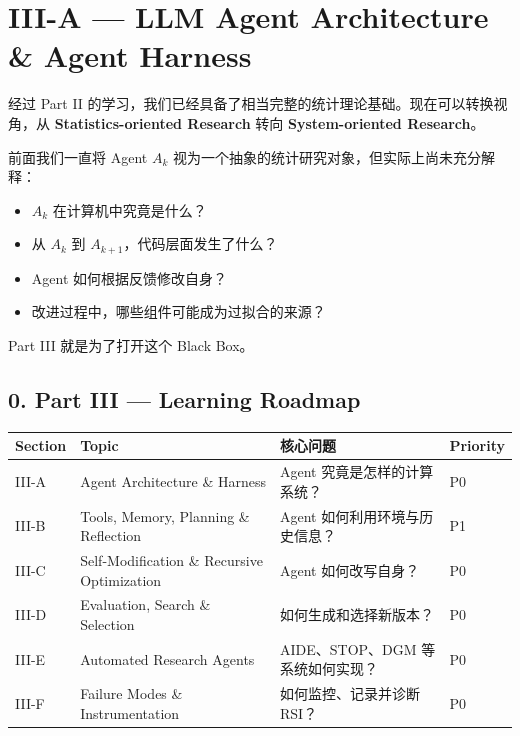 \hypertarget{part-3-31-0001-iii-a-llm-agent-architecture-agent-harness}{%
\section{III-A --- LLM Agent Architecture \& Agent Harness}\label{part-3-31-0001-iii-a-llm-agent-architecture-agent-harness}}

经过 Part II 的学习，我们已经具备了相当完整的统计理论基础。现在可以转换视角，从 \textbf{Statistics-oriented Research} 转向 \textbf{System-oriented Research}。

前面我们一直将 Agent \(A_k\) 视为一个抽象的统计研究对象，但实际上尚未充分解释：

\begin{itemize}
\tightlist
\item
  \(A_k\) 在计算机中究竟是什么？
\item
  从 \(A_k\) 到 \(A_{k+1}\)，代码层面发生了什么？
\item
  Agent 如何根据反馈修改自身？
\item
  改进过程中，哪些组件可能成为过拟合的来源？
\end{itemize}

Part III 就是为了打开这个 Black Box。

\hypertarget{part-3-31-0001-part-iii-learning-roadmap}{%
\subsection{0. Part III --- Learning Roadmap}\label{part-3-31-0001-part-iii-learning-roadmap}}

\begin{readertable}
\begin{longtable}[]{@{}
  >{\raggedright\arraybackslash}p{}
  >{\raggedright\arraybackslash}p{}
  >{\raggedright\arraybackslash}p{}
  >{\raggedright\arraybackslash}p{}@{}}
\toprule
Section & Topic & 核心问题 & Priority \\
\midrule
\endhead
III-A & Agent Architecture \& Harness & Agent 究竟是怎样的计算系统？ & P0 \\
III-B & Tools, Memory, Planning \& Reflection & Agent 如何利用环境与历史信息？ & P1 \\
III-C & Self-Modification \& Recursive Optimization & Agent 如何改写自身？ & P0 \\
III-D & Evaluation, Search \& Selection & 如何生成和选择新版本？ & P0 \\
III-E & Automated Research Agents & AIDE、STOP、DGM 等系统如何实现？ & P0 \\
III-F & Failure Modes \& Instrumentation & 如何监控、记录并诊断 RSI？ & P0 \\
\bottomrule
\end{longtable}
\end{readertable}

